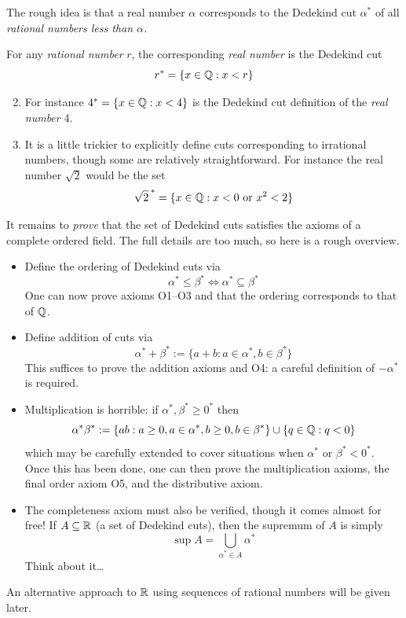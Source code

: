 The rough idea is that a real number $\alpha$ corresponds to the Dedekind cut $\alpha^*$ of all \emph{rational numbers less than $\alpha$.}

\begin{examples}{}{}
	\exstart For any \emph{rational number} $r$, the corresponding \emph{real number} is the Dedekind cut
	\[
		r^*=\{x\in\mathbb{Q}:x<r\}
	\]
	\begin{enumerate}\setcounter{enumi}{1}
	  \item[]For instance $4^*=\{x\in\mathbb{Q}:x<4\}$ is the Dedekind cut definition of the  \emph{real number} 4.
	  \item It is a little trickier to explicitly define cuts corresponding to irrational numbers, though some are relatively straightforward. For instance the real number $\sqrt 2$ would be the set
		\[
			{\sqrt 2\,}^*=\{x\in\mathbb{Q}:x<0\text{ or }x^2<2\}
		\]
	\end{enumerate}
\end{examples}

It remains to \emph{prove} that the set of Dedekind cuts satisfies the axioms of a complete ordered field. The full details are too much, so here is a rough overview.
\begin{itemize}
  \item Define the ordering of Dedekind cuts via
	\[
		\alpha^*\le\beta^*\iff\alpha^*\subseteq\beta^*
	\]
	One can now prove axioms O1--O3 and that the ordering corresponds to that of $\mathbb{Q}$.
	\item Define addition of cuts via
	\[
		\alpha^*+\beta^*:=\{a+b:a\in\alpha^*,b\in\beta^*\}
	\]
	This suffices to prove the addition axioms and O4: a careful definition of $-\alpha^*$ is required.
	\item Multiplication is horrible: if $\alpha^*,\beta^*\ge 0^*$ then
	\[
		\alpha^*\beta^*:=\{ab:a\ge 0,a\in \alpha^*,b\ge 0,b\in \beta^*\}\cup\{q\in\mathbb{Q}:q<0\}
	\]
	which may be carefully extended to cover situations when $\alpha^*$ or $\beta^*<0^*$. Once this has been done, one can then prove the multiplication axioms, the final order axiom O5, and the distributive axiom.
	\item The completeness axiom must also be verified, though it comes almost for free! If $A\subseteq\mathbb{R}$ (a set of Dedekind cuts), then the supremum of $A$ is simply
	\[
		\sup A=\bigcup\limits_{\alpha^*\in A}\alpha^*
	\]
	Think about it\ldots
\end{itemize}

An alternative approach to $\mathbb{R}$ using sequences of rational numbers will be given later.


